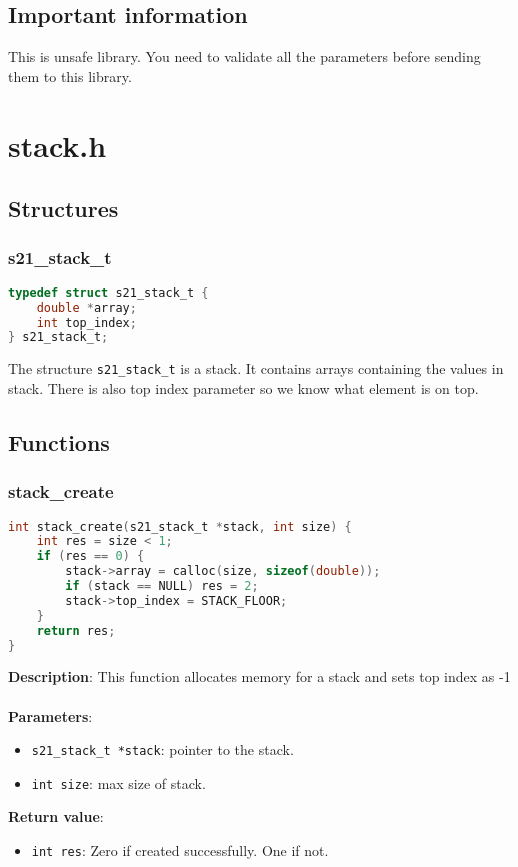 \documentclass{article}
\begin{document}
\subsection{Important information}
This is unsafe library. You need to validate all the parameters before sending them to this library.

\section{stack.h}
\subsection{Structures}
\subsubsection{s21\_stack\_t}
\begin{lstlisting}[language=C]
typedef struct s21_stack_t {
    double *array;
    int top_index;
} s21_stack_t;
\end{lstlisting}
The structure \texttt{s21\_stack\_t} is a stack. It contains arrays containing the values in stack. There is also top index parameter so we know what element is on top.
\subsection{Functions}

\subsubsection{stack\_create}
\begin{lstlisting}[language=C]
int stack_create(s21_stack_t *stack, int size) {
    int res = size < 1;
    if (res == 0) {
        stack->array = calloc(size, sizeof(double));
        if (stack == NULL) res = 2;
        stack->top_index = STACK_FLOOR;
    }
    return res;
}
\end{lstlisting}
\noindent
\textbf{Description}: This function allocates memory for a stack and sets top index as -1\\\\
\textbf{Parameters}:
\begin{itemize}
    \item \texttt{s21\_stack\_t *stack}: pointer to the stack.
    \item \texttt{int size}: max size of stack.
\end{itemize}
\textbf{Return value}:
\begin{itemize}
    \item \texttt{int res}: Zero if created successfully. One if not.
\end{itemize}
\end{document}
